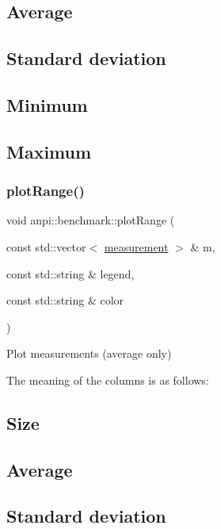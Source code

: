 \subsection*{Average}

\subsection*{Standard deviation}

\subsection*{Minimum}

\subsection*{Maximum}\mbox{\label{namespaceanpi_1_1benchmark_a58babb1b967728c138790779206a61a1}} 
\subsubsection{\texorpdfstring{plot\+Range()}{plotRange()}}
{\footnotesize\ttfamily void anpi\+::benchmark\+::plot\+Range (\begin{DoxyParamCaption}\item[{const std\+::vector$<$ \hyperlink{structanpi_1_1benchmark_1_1measurement}{measurement} $>$ \&}]{m,  }\item[{const std\+::string \&}]{legend,  }\item[{const std\+::string \&}]{color }\end{DoxyParamCaption})}

Plot measurements (average only)

The meaning of the columns is as follows\+: \subsection*{Size}

\subsection*{Average}

\subsection*{Standard deviation}


